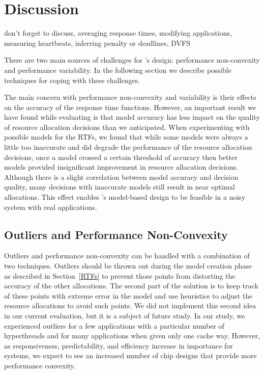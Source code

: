 \chapter{Discussion}\label{discuss}

don't forget to discuss, averaging response times, modifying applications, measuring heartbeats, inferring penalty or deadlines, DVFS

There are two main sources of challenges for \pacora's design: performance non-convexity and performance variability.  In the following section we describe possible techniques for coping with these challenges.

The main concern with performance non-convexity and variability is their effects on the accuracy of the response time functions.  However, an important result we have found while evaluating \pacora is that model accuracy has less impact on the quality of resource allocation decisions than we anticipated.  When experimenting with possible models for the RTFs, we found that while some models were always a little too inaccurate and did degrade the performance of the resource allocation decisions, once a model crossed a certain threshold of accuracy then better models provided insignificant improvement in resource allocation decisions.  Although there is a slight correlation between model accuracy and decision quality, many decisions with inaccurate models still result in near optimal allocations.  This effect enables \pacora's model-based design to be feasible in a noisy system with real applications.

\section{Outliers and Performance Non-Convexity}

Outliers and performance non-convexity can be handled with a combination of two techniques.  Outliers should be thrown out during the model creation phase as described in Section~\ref{RTFs} to prevent those points from distorting the accuracy of the other allocations.  The second part of the solution is to keep track of these points with extreme error in the model and use heuristics to adjust the resource allocations to avoid such points.  We did not implement this second idea in our current evaluation, but it is a subject of future study.  In our study, we experienced outliers for a few applications with a particular number of hyperthreads and for many applications when given only one cache way. However, as responsiveness, predictability, and efficiency increase in importance for systems, we expect to see an increased number of chip designs that provide more performance convexity.

